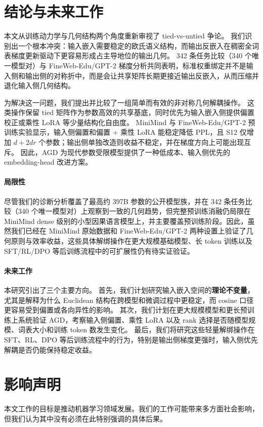 \documentclass{article}
\theoremstyle{plain}
\theoremstyle{definition}
\theoremstyle{remark}
\begin{document}
\section{结论与未来工作}
\label{sec:conclusion}

本文从训练动力学与几何结构两个角度重新审视了 tied-vs-untied 争论。
我们识别出一个根本冲突：输入嵌入需要稳定的欧氏语义结构，而输出反嵌入在稠密全词表梯度更新驱动下更容易形成占主导地位的输出几何。
342 条任务比较（340 个唯一模型对）与 FineWeb-Edu/GPT-2 梯度分析共同表明，标准权重绑定并不是输入侧和输出侧的对称折中，而是会让共享矩阵长期更接近输出反嵌入，从而压缩并退化输入侧几何结构。

为解决这一问题，我们提出并比较了一组简单而有效的非对称几何解耦操作。
这类操作保留 tied 矩阵作为参数高效的共享基底，同时优先为输入嵌入侧提供偏置校正或乘性 LoRA 等少量结构化自由度。
MiniMind 与 FineWeb-Edu/GPT-2 预训练实验显示，输入侧偏置和偏置 + 乘性 LoRA 能稳定降低 PPL，且 S12 仅增加 $d+2dr$ 个参数；输出侧单独改造则收益不稳定，并在梯度方向上可能出现互斥。
因此，AGD 为现代参数受限模型提供了一种低成本、输入侧优先的 embedding-head 改进方案。

\paragraph{局限性}
尽管我们的诊断分析覆盖了最高约 397B 参数的公开模型族，并在 342 条任务比较（340 个唯一模型对）上观察到一致的几何趋势，但完整预训练消融仍局限在 MiniMind dense 级别的小型因果语言模型上，并主要覆盖预训练阶段。因此，虽然我们已经在 MiniMind 原始数据和 FineWeb-Edu/GPT-2 两种设置上验证了几何原则与效率收益，这些具体解绑操作在更大规模基础模型、长 token 训练以及 SFT/RL/DPO 等后训练流程中的可扩展性仍有待实证验证。

\paragraph{未来工作}
本研究引出了三个主要方向。
首先，我们计划研究输入嵌入空间的\textbf{理论不变量}，尤其是解释为什么 Euclidean 结构在跨模型和微调过程中更稳定，而 cosine 口径更容易受到偏置或各向异性的影响。
其次，我们计划在更大规模模型和更长预训练上系统验证 AGD，考察输入侧偏置、乘性 LoRA 以及 rank 选择是否随模型规模、词表大小和训练 token 数发生变化。
最后，我们将研究这些轻量解绑操作在 SFT、RL、DPO 等后训练流程中的行为，特别是输出侧梯度更强时，输入侧优先解耦是否仍能保持稳定收益。







\section*{影响声明}
本文工作的目标是推动机器学习领域发展。我们的工作可能带来多方面社会影响，但我们认为其中没有必须在此特别强调的具体后果。









\appendix



\newpage


\end{document}
